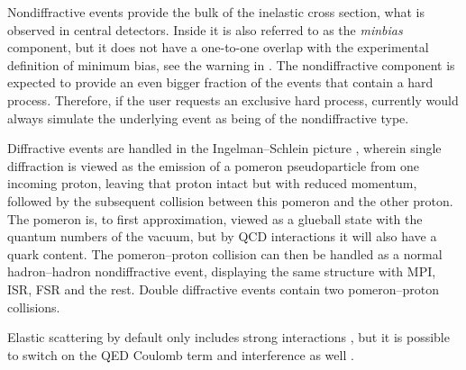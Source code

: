 Nondiffractive events provide the bulk of the inelastic cross section,
\ie what is observed in central detectors. Inside \pythia it is also 
referred to as the {\it minbias} component, but it does not have a one-to-one
overlap with the experimental definition of minimum bias,
see the warning in . The nondiffractive
component is expected to provide an even bigger fraction of the events
that contain a hard process. Therefore, if the user requests an exclusive
hard process, currently \pythia would always simulate the underlying 
event as being of the nondiffractive type.

Diffractive events are handled in the Ingelman--Schlein picture
\cite{Ingelman:1984ns}, wherein single diffraction is viewed
as the emission of a pomeron pseudoparticle from one incoming proton,
leaving that proton intact but with reduced momentum, followed by the 
subsequent collision between this pomeron and the other proton. The
pomeron is, to first approximation, viewed as a glueball state with
the quantum numbers of the vacuum, but by QCD interactions it will also
have a quark content. The pomeron--proton collision can then be handled 
as a normal hadron--hadron nondiffractive event, displaying the same
structure with MPI, ISR, FSR and the rest. Double diffractive
events contain two pomeron--proton collisions. 

Elastic scattering by default only includes strong interactions
\cite{Schuler:1993wr}, but it is possible to switch on the QED 
Coulomb term and interference as well \cite{Bernard:1987vq}.  



